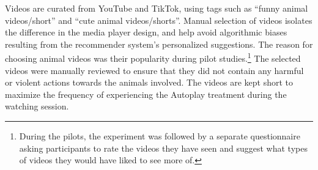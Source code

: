 \documentclass[11pt,a4paper,oneside]{article}
\begin{document}


Videos are curated from YouTube and TikTok, using tags such as ``funny animal videos/short'' and ``cute animal videos/shorts''. Manual selection of videos isolates the difference in the media player design, and help avoid algorithmic biases resulting from the recommender system's personalized suggestions. The reason for choosing animal videos was their popularity during pilot studies.\footnote{During the pilots, the experiment was followed by a separate questionnaire asking participants to rate the videos they have seen and suggest what types of videos they would have liked to see more of.} The selected videos were manually  reviewed to ensure that they did not contain any harmful or violent actions towards the animals involved. The videos are kept short to maximize the frequency of experiencing the Autoplay treatment during the watching session.  




\end{document}
